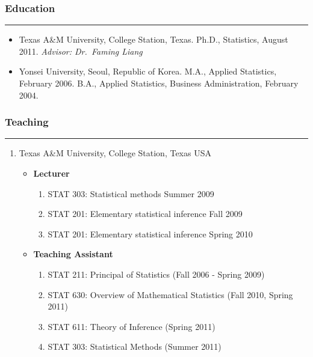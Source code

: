 \documentclass[
]{book}
\providecommand{\tightlist}{%
  \setlength{\itemsep}{0pt}\setlength{\parskip}{0pt}}
\begin{document}
\hypertarget{education}{%
\subsubsection*{Education}\label{education}}

\begin{center}\rule{0.5\linewidth}{0.5pt}\end{center}

\begin{itemize}
\item
  Texas A\&M University, College Station, Texas.
  Ph.D., Statistics, August 2011.
  \emph{Advisor: Dr.~Faming Liang}
\item
  Yonsei University, Seoul, Republic of Korea.
  M.A., Applied Statistics, February 2006.
  B.A., Applied Statistics, Business Administration, February 2004.
\end{itemize}

\hypertarget{teaching}{%
\subsubsection*{Teaching}\label{teaching}}

\begin{center}\rule{0.5\linewidth}{0.5pt}\end{center}

\begin{enumerate}
\def\labelenumi{\arabic{enumi}.}
\item
  Texas A\&M University, College Station, Texas USA

  \begin{itemize}
  \item
    \textbf{Lecturer}

    \begin{enumerate}
    \def\labelenumii{\arabic{enumii}.}
    \tightlist
    \item
      STAT 303: Statistical methods Summer 2009
    \item
      STAT 201: Elementary statistical inference Fall 2009
    \item
      STAT 201: Elementary statistical inference Spring 2010
    \end{enumerate}
  \item
    \textbf{Teaching Assistant}

    \begin{enumerate}
    \def\labelenumii{\arabic{enumii}.}
    \tightlist
    \item
      STAT 211: Principal of Statistics (Fall 2006 - Spring 2009)
    \item
      STAT 630: Overview of Mathematical Statistics (Fall 2010, Spring 2011)
    \item
      STAT 611: Theory of Inference (Spring 2011)
    \item
      STAT 303: Statistical Methods (Summer 2011)
    \end{enumerate}
  \end{itemize}
\end{enumerate}
\end{document}
